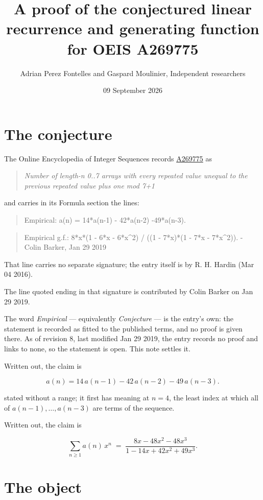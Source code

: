 \documentclass[11pt]{article}
\title{A proof of the conjectured linear recurrence and generating function for OEIS A269775}
\author{Adrian Perez Fontelles and Gaspard Moulinier, Independent researchers}
\date{09 September 2026}
\theoremstyle{definition}
\begin{document}
\maketitle
\section{The conjecture}

The Online Encyclopedia of Integer Sequences records \href{https://oeis.org/A269775}{A269775} as

\begin{quote}\itshape Number of length-n 0..7 arrays with every repeated value unequal to the previous repeated value plus one mod 7+1\end{quote}

and carries in its Formula section the lines:

\begin{quote}\ttfamily Empirical: a(n) = 14*a(n-1) - 42*a(n-2)  -49*a(n-3).\end{quote}

\begin{quote}\ttfamily Empirical g.f.: 8*x*(1 - 6*x - 6*x\textasciicircum{}2) / ((1 - 7*x)*(1 - 7*x - 7*x\textasciicircum{}2)). - Colin Barker, Jan 29 2019\end{quote}

That line carries no separate signature; the entry itself is by R. H. Hardin (Mar 04 2016).

The line quoted ending in that signature is contributed by Colin Barker on Jan 29 2019.

The word {\itshape Empirical} --- equivalently {\itshape Conjecture} --- is the entry's own: the statement is recorded as fitted to the published terms, and no proof is given there. As of revision 8, last modified Jan 29 2019, the entry records no proof and links to none, so the statement is open. This note settles it.

Written out, the claim is

\[a(n) = 14\,a(n-1) - 42\,a(n-2) - 49\,a(n-3).\]

stated without a range; it first has meaning at $n = 4$, the least index at which all of $a(n-1),\dots,a(n-3)$ are terms of the sequence.

Written out, the claim is

\[\sum_{n \ge 1} a(n)\,x^n \;=\; \frac{8x - 48x^{2} - 48x^{3}}{1 - 14x + 42x^{2} + 49x^{3}}.\]

\section{The object}
\end{document}
